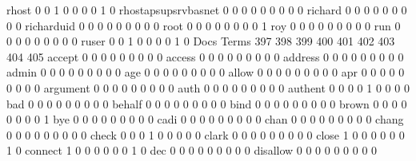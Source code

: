 \documentclass[compress,8pt]{beamer}
\begin{document}
\begin{frame}
\begin{Schunk}
  rhost                                      0   0   1   0   0   0   0   1   0
  rhostapsupsrvbasnet                        0   0   0   0   0   0   0   0   0
  richard                                    0   0   0   0   0   0   0   0   0
  richarduid                                 0   0   0   0   0   0   0   0   0
  root                                       0   0   0   0   0   0   0   0   1
  roy                                        0   0   0   0   0   0   0   0   0
  run                                        0   0   0   0   0   0   0   0   0
  ruser                                      0   0   1   0   0   0   0   1   0
                                          Docs
Terms                                      397 398 399 400 401 402 403 404 405
  accept                                     0   0   0   0   0   0   0   0   0
  access                                     0   0   0   0   0   0   0   0   0
  address                                    0   0   0   0   0   0   0   0   0
  admin                                      0   0   0   0   0   0   0   0   0
  age                                        0   0   0   0   0   0   0   0   0
  allow                                      0   0   0   0   0   0   0   0   0
  apr                                        0   0   0   0   0   0   0   0   0
  argument                                   0   0   0   0   0   0   0   0   0
  auth                                       0   0   0   0   0   0   0   0   0
  authent                                    0   0   0   0   1   0   0   0   0
  bad                                        0   0   0   0   0   0   0   0   0
  behalf                                     0   0   0   0   0   0   0   0   0
  bind                                       0   0   0   0   0   0   0   0   0
  brown                                      0   0   0   0   0   0   0   0   1
  bye                                        0   0   0   0   0   0   0   0   0
  cadi                                       0   0   0   0   0   0   0   0   0
  chan                                       0   0   0   0   0   0   0   0   0
  chang                                      0   0   0   0   0   0   0   0   0
  check                                      0   0   0   1   0   0   0   0   0
  clark                                      0   0   0   0   0   0   0   0   0
  close                                      1   0   0   0   0   0   0   1   0
  connect                                    1   0   0   0   0   0   0   1   0
  dec                                        0   0   0   0   0   0   0   0   0
  disallow                                   0   0   0   0   0   0   0   0   0

\end{Schunk}
\end{frame}
\end{document}
